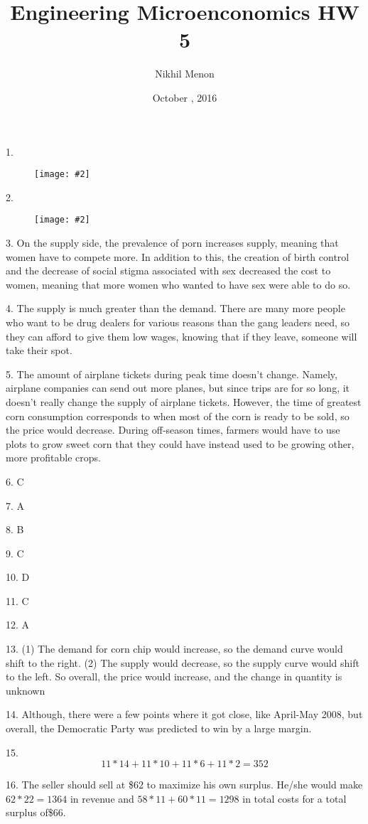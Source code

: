 \documentclass{article}
\title{Engineering Microenconomics HW 5}
\author{Nikhil Menon}
\date{October , 2016}
\newcommand{\makefig}[2]{
\begin{figure}[h]
\centering
\texttt{[image: \#2]}
\end{figure}
}
\begin{document}
\maketitle

1. \makefig{1}{P1.png}

2. \makefig{1}{P2.png}

3. On the supply side, the prevalence of porn increases supply, meaning that women have to compete more. In addition to this, the creation of birth control and the decrease of social stigma associated with sex decreased the cost to women, meaning that more women who wanted to have sex were able to do so.

4. The supply is much greater than the demand. There are many more people who want to be drug dealers for various reasons than the gang leaders need, so they can afford to give them low wages, knowing that if they leave, someone will take their spot.

5. The amount of airplane tickets during peak time doesn't change. Namely, airplane companies can send out more planes, but since trips are for so long, it doesn't really change the supply of airplane tickets. However, the time of greatest corn consumption corresponds to when most of the corn is ready to be sold, so the price would decrease. During off-season times, farmers would have to use plots to grow sweet corn that they could have instead used to be growing other, more profitable crops.

6. C

7. A

8. B

9. C

10. D

11. C

12. A

13. (1) The demand for corn chip would increase, so the demand curve would shift to the right.
(2) The supply would decrease, so the supply curve would shift to the left.
So overall, the price would increase, and the change in quantity is unknown

14. Although, there were a few points where it got close, like April-May 2008, but overall, the Democratic Party was predicted to win by a large margin.

15. 
$$11*14+11*10+11*6+11*2=352$$

16. The seller should sell at \$62 to maximize his own surplus. He/she would make $62*22=1364$ in revenue and $58*11+60*11=1298$ in total costs for a total surplus of\$66.
\end{document}
